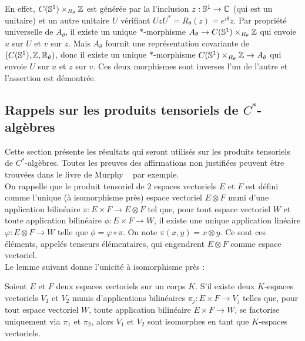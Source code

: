 En effet, $C(\mathbb S^1)\times_{R_\theta} \mathbb Z$ est générée par la l'inclusion $z : \mathbb S^1\rightarrow \mathbb C$ (qui est un unitaire) et un autre unitaire $U$ vérifiant $UzU^*=R_\theta(z)=e^{i\theta} z$. Par propriété universelle de $A_\theta$, il existe un unique $*$-morphisme $A_\theta \rightarrow C(\mathbb S^1)\times_{R_\theta} \mathbb Z $ qui envoie $u$ sur $U$ et $v$ sur $z$. Mais $A_\theta$ fournit une représentation covariante de $(C(\mathbb S^1), \mathbb Z,\mathbb R_\theta)$, donc il existe un unique $*$-morphisme $C(\mathbb S^1)\times_{R_\theta} \mathbb Z \rightarrow A_\theta  $ qui envoie $U$ sur $u$ et $z$ sur $v$. Ces deux morphismes sont inverses l'un de l'autre et l'assertion est démontrée.\\

\subsection{Rappels sur les produits tensoriels de $C^*$-algèbres}

Cette section présente les résultats qui seront utilisés sur les produits tensoriels de $C^*$-algèbres. Toutes les preuves des affirmations non justifiées peuvent être trouvées dans le livre de Murphy ~\cite{Murphy} par exemple.\\

On rappelle que le produit tensoriel de $2$ espaces vectoriels $E$ et $F$ est défini comme l'unique (à isomorphisme près) espace vectoriel $E\otimes F$ muni d'une application bilinéaire $\pi : E\times F \rightarrow E\otimes F$ tel que, pour tout espace vectoriel $W$ et toute application bilinéaire $\phi : E \times F \rightarrow W $, il existe une unique application linéaire $\varphi :E\otimes F \rightarrow W$ telle que $\phi = \varphi\circ \pi$. On note $\pi(x,y)=x\otimes y$. Ce sont ces éléments, appelés tenseurs élémentaires, qui engendrent $E\otimes F$ comme espace vectoriel.\\ 

Le lemme suivant donne l'unicité à isomorphisme près :

\begin{lem}
Soient $E$ et $F$ deux espaces vectoriels sur un corps $K$. S'il existe deux $K$-espaces vectoriels $V_1$ et $V_2$ munis d'applications bilinéaires $\pi_j : E\times F \rightarrow V_j$ telles que, pour tout espace vectoriel $W$, toute application bilinéaire $E\times F \rightarrow W$,  se factorise uniquement via $\pi_1$ et $\pi_2$, alors $V_1$ et $V_2$ sont isomorphes en tant que $K$-espaces vectoriels.
\end{lem}


